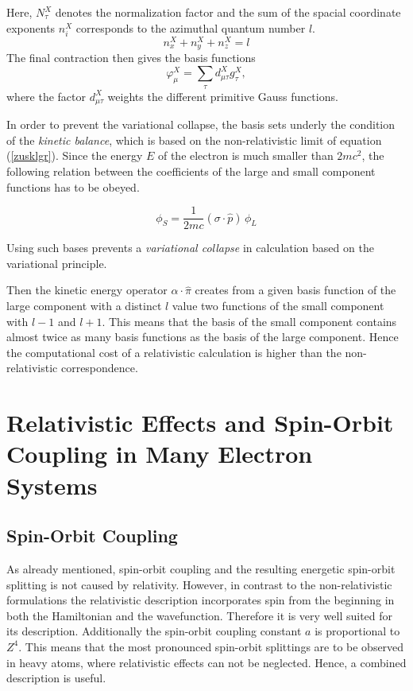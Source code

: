 Here, $N_\tau^X$ denotes the normalization factor and the sum of the spacial
coordinate exponents $n_i^X$ corresponds to the azimuthal quantum number $l$.
\begin{equation}
n_x^X+n_y^X+n_z^X=l
\end{equation}
The final contraction then gives the basis functions
\begin{equation}
\varphi^X_\mu = \sum\limits_\tau d_{\mu\tau}^Xg_\tau^X,
\end{equation}
where the factor $d_{\mu\tau}^X$ weights the different primitive Gauss functions.

In order to prevent the variational collapse, the basis sets underly the condition
of the \emph{kinetic balance}, which is based on the non-relativistic limit of
equation (\ref{zusklgr}). Since the energy $E$ of the electron is much smaller than
$2mc^2$, the following relation between the coefficients
of the large and small component functions has to be obeyed.

\begin{equation}\label{kinbal}
\phi_S = \frac1{2mc}(\sigma\cdot\hat{p})\,\phi_L
\end{equation}

Using such bases prevents a \emph{variational collapse} in calculation based on
the variational principle.

Then the kinetic energy operator $\alpha\cdot\hat{\pi}$ creates from a given basis
function of the large component with a distinct $l$ value two functions of the small
component with $l-1$ and $l+1$. This means that the basis of the small component
contains almost twice as many basis functions as the basis of the large component.
Hence the computational cost of a relativistic calculation is higher than the
non-relativistic correspondence.






\section{Relativistic Effects and Spin-Orbit Coupling in Many Electron Systems}
\subsection{Spin-Orbit Coupling}
As already mentioned, spin-orbit coupling and the resulting energetic spin-orbit
splitting is not caused by relativity. However, in contrast to the
non-relativistic formulations the relativistic description incorporates spin
from the beginning in both the Hamiltonian and the wavefunction.
Therefore it is very well suited for its description.
Additionally the spin-orbit coupling constant $a$ is proportional to $Z^4$.
This means that the most pronounced spin-orbit splittings are to be observed
in heavy atoms, where relativistic effects can not be neglected. Hence, a
combined description is useful.

